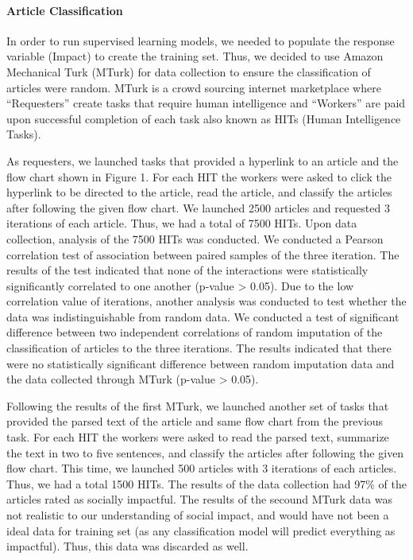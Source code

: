 \documentclass[10pt,letterpaper]{article}
\begin{document}
\hypertarget{article-classification}{%
\paragraph{Article Classification}\label{article-classification}}

In order to run supervised learning models, we needed to populate the
response variable (Impact) to create the training set. Thus, we decided
to use Amazon Mechanical Turk (MTurk) for data collection to ensure the
classification of articles were random. MTurk is a crowd sourcing
internet marketplace where ``Requesters'' create tasks that require
human intelligence and ``Workers'' are paid upon successful completion
of each task also known as HITs (Human Intelligence Tasks).

As requesters, we launched tasks that provided a hyperlink to an article
and the flow chart shown in Figure 1. For each HIT the workers were
asked to click the hyperlink to be directed to the article, read the
article, and classify the articles after following the given flow chart.
We launched 2500 articles and requested 3 iterations of each article.
Thus, we had a total of 7500 HITs. Upon data collection, analysis of the
7500 HITs was conducted. We conducted a Pearson correlation test of
association between paired samples of the three iteration. The results
of the test indicated that none of the interactions were statistically
significantly correlated to one another (p-value \textgreater{} 0.05).
Due to the low correlation value of iterations, another analysis was
conducted to test whether the data was indistinguishable from random
data. We conducted a test of significant difference between two
independent correlations of random imputation of the classification of
articles to the three iterations. The results indicated that there were
no statistically significant difference between random imputation data
and the data collected through MTurk (p-value \textgreater{} 0.05).

Following the results of the first MTurk, we launched another set of
tasks that provided the parsed text of the article and same flow chart
from the previous task. For each HIT the workers were asked to read the
parsed text, summarize the text in two to five sentences, and classify
the articles after following the given flow chart. This time, we
launched 500 articles with 3 iterations of each articles. Thus, we had a
total 1500 HITs. The results of the data collection had 97\% of the
articles rated as socially impactful. The results of the secound MTurk
data was not realistic to our understanding of social impact, and would
have not been a ideal data for training set (as any classification model
will predict everything as impactful). Thus, this data was discarded as
well.
\end{document}
